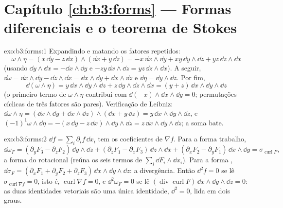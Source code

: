 \section*{Capítulo \ref{ch:b3:forms} --- Formas diferenciais e
o teorema de Stokes}

\begin{solution}{exo:b3:forms:1}
Expandindo e matando os fatores repetidos:
\[
\omega\wedge\eta = (x\,\dd y - z\,\dd x)\wedge(\dd x +
y\,\dd z)
= -x\,\dd x\wedge\dd y + xy\,\dd y\wedge\dd z +
yz\,\dd z\wedge\dd x
\]
(usando $\dd y\wedge\dd x = -\dd x\wedge\dd y$ e $-zy\,\dd
x\wedge\dd z = yz\,\dd z\wedge\dd x$). A seguir, $\dd\omega =
\dd x\wedge\dd y - \dd z\wedge\dd x = \dd x\wedge\dd y +
\dd x\wedge\dd z$ e $\dd\eta = \dd y\wedge\dd z$. Por fim,
\[
\dd(\omega\wedge\eta) = y\,\dd x\wedge\dd y\wedge\dd z +
z\,\dd y\wedge\dd z\wedge\dd x = (y + z)\,\dd x\wedge\dd
y\wedge\dd z
\]
(o primeiro termo de $\omega\wedge\eta$ contribui com $\dd(-x)
\wedge\dd x\wedge\dd y = 0$; permutações cíclicas de três
fatores são pares). Verificação de Leibniz: $\dd\omega\wedge\eta =
(\dd x\wedge\dd y + \dd x\wedge\dd z)\wedge(\dd x + y\,\dd
z) = y\,\dd x\wedge\dd y\wedge\dd z$, e
$(-1)^1\omega\wedge\dd\eta = -(x\,\dd y - z\,\dd
x)\wedge\dd y\wedge\dd z = z\,\dd x\wedge\dd y\wedge\dd z$;
a soma bate.
\end{solution}

\begin{solution}{exo:b3:forms:2}
$\dd f = \sum_i\partial_if\,\dd x_i$ tem os coeficientes de
$\nabla f$. Para a forma trabalho,
\[
\dd\omega_F = (\partial_yF_3 - \partial_zF_2)\,\dd y\wedge\dd
z + (\partial_zF_1 - \partial_xF_3)\,\dd z\wedge\dd x +
(\partial_xF_2 - \partial_yF_1)\,\dd x\wedge\dd y =
\sigma_{\operatorname{curl}F},
\]
a forma  do rotacional (reúna os seis termos de
$\sum_i\dd F_i\wedge\dd x_i$). Para a forma ,
$\dd\sigma_F = (\partial_xF_1 + \partial_yF_2 +
\partial_zF_3)\,\dd x\wedge\dd y\wedge\dd z$: a
divergência. Então $\dd^2f = 0$ se lê
$\sigma_{\operatorname{curl}\nabla f} = 0$, isto é,
$\operatorname{curl}\nabla f = 0$, e $\dd^2\omega_F = 0$
se lê $(\operatorname{div}\operatorname{curl}F)\,\dd
x\wedge\dd y\wedge\dd z = 0$: as duas identidades vetoriais são
uma única identidade, $\dd^2 = 0$, lida em dois graus.
\end{solution}

